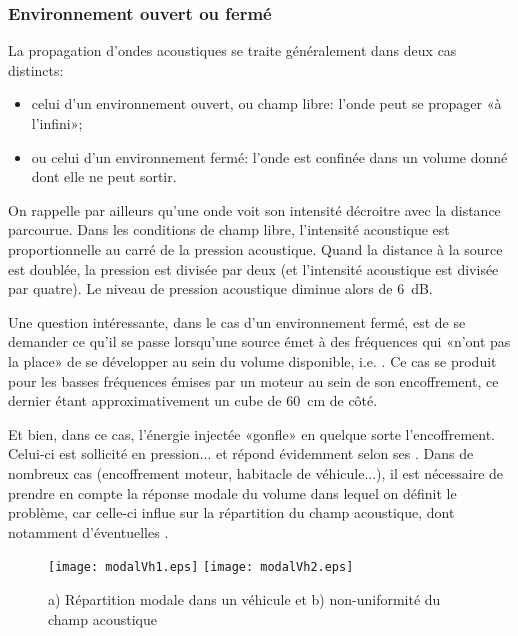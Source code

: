 \medskip
\subsubsection{Environnement ouvert ou fermé}

La propagation d'ondes acoustiques se traite généralement dans deux cas distincts:
\begin{itemize}
   \item celui d'un environnement ouvert, ou champ libre: l'onde peut se propager «à l'infini»;
   \item ou celui d'un environnement fermé: l'onde est confinée dans un volume donné dont elle ne peut sortir.
\end{itemize}

On rappelle par ailleurs qu'une onde voit son intensité décroitre avec la distance parcourue.
Dans les conditions de champ libre, l'intensité acoustique est proportionnelle au carré de la pression acoustique. Quand la distance à la source est doublée, la pression est divisée par deux (et l'intensité acoustique est divisée par quatre). Le niveau de pression acoustique diminue alors de 6~dB.

\medskip
Une question intéressante, dans le cas d'un environnement fermé, est de se demander ce qu'il se passe lorsqu'une source émet à des fréquences qui «n'ont pas la place» de se développer au sein du volume disponible, i.e. . Ce cas se produit pour les basses fréquences émises par un moteur au sein de son encoffrement, ce dernier étant approximativement un cube de 60~cm de côté.

Et bien, dans ce cas, l'énergie injectée «gonfle» en quelque sorte l'encoffrement. Celui-ci est sollicité en pression... et répond évidemment selon ses .
Dans de nombreux cas (encoffrement moteur, habitacle de véhicule...), il est nécessaire de prendre en compte la réponse modale du volume dans lequel on définit le problème, car celle-ci influe sur la répartition du champ acoustique, dont notamment d'éventuelles .
\begin{figure}[h!]
\centering
\texttt{[image: modalVh1.eps]}\hspace{10mm}%
\texttt{[image: modalVh2.eps]}
\caption{a) Répartition modale dans un véhicule et b) non-uniformité du champ acoustique}\label{Fig-modalVh}
\end{figure}

